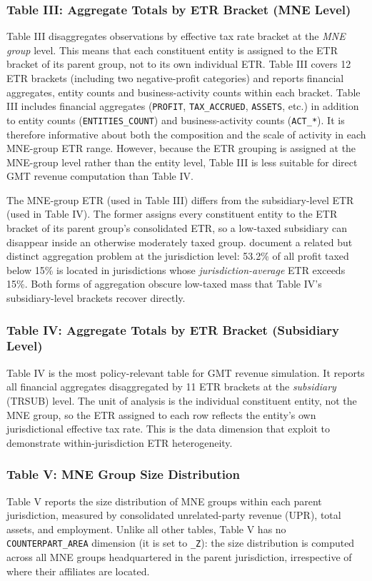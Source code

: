 \documentclass[11pt,a4paper]{article}
\newcommand{\code}[1]{\texttt{#1}}
\begin{document}
\subsubsection{Table III: Aggregate Totals by ETR Bracket (MNE Level)}\label{sec:table3}
Table III disaggregates observations by effective tax rate bracket at the \emph{MNE group} level. This means that each constituent entity is assigned to the ETR bracket of its parent group, not to its own individual ETR. Table III covers 12 ETR brackets (including two negative-profit categories) and reports financial aggregates, entity counts and business-activity counts within each bracket. Table III includes financial aggregates (\code{PROFIT}, \code{TAX\_ACCRUED}, \code{ASSETS}, etc.) in addition to entity counts (\code{ENTITIES\_COUNT}) and business-activity counts (\code{ACT\_*}). It is therefore informative about both the composition and the scale of activity in each MNE-group ETR range. However, because the ETR grouping is assigned at the MNE-group level rather than the entity level, Table III is less suitable for direct GMT revenue computation than Table IV. 

The MNE-group ETR (used in Table III) differs from the subsidiary-level ETR (used in Table IV). The former assigns every constituent entity to the ETR bracket of its parent group's consolidated ETR, so a low-taxed subsidiary can disappear inside an otherwise moderately taxed group. \citet{hugger2026} document a related but distinct aggregation problem at the jurisdiction level: 53.2\% of all profit taxed below 15\% is located in jurisdictions whose \emph{jurisdiction-average} ETR exceeds 15\%. Both forms of aggregation obscure low-taxed mass that Table IV's subsidiary-level brackets recover directly.

\subsubsection{Table IV: Aggregate Totals by ETR Bracket (Subsidiary Level)}\label{sec:table4}
Table IV is the most policy-relevant table for GMT revenue simulation. It reports all financial aggregates disaggregated by 11 ETR brackets at the \emph{subsidiary} (TRSUB) level. The unit of analysis is the individual constituent entity, not the MNE group, so the ETR assigned to each row reflects the entity's own jurisdictional effective tax rate. This is the data dimension that \citet{hugger2026} exploit to demonstrate within-jurisdiction ETR heterogeneity.

\subsubsection{Table V: MNE Group Size Distribution}\label{sec:table5}
Table V reports the size distribution of MNE groups within each parent jurisdiction, measured by consolidated unrelated-party revenue (UPR), total assets, and employment. Unlike all other tables, Table V has no \code{COUNTERPART\_AREA} dimension (it is set to \code{\_Z}): the size distribution is computed across all MNE groups headquartered in the parent jurisdiction, irrespective of where their affiliates are located.
\end{document}
